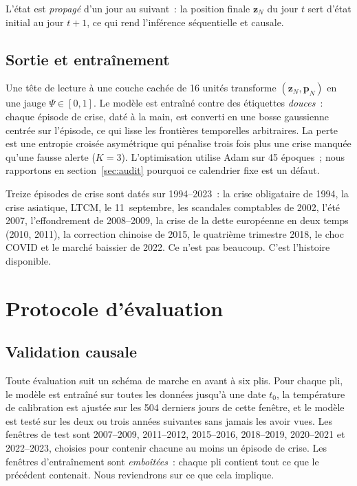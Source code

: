 \documentclass[11pt,a4paper]{article}
\newcommand{\Psiv}{\Psi}
\begin{document}
L'état est \emph{propagé} d'un jour au suivant~: la position finale $\mathbf z_N$ du jour $t$ sert d'état initial au jour $t+1$, ce qui rend l'inférence séquentielle et causale.

\subsection{Sortie et entraînement}

Une tête de lecture à une couche cachée de 16 unités transforme $(\mathbf z_N,\mathbf p_N)$ en une jauge $\Psiv\in[0,1]$. Le modèle est entraîné contre des étiquettes \emph{douces}~: chaque épisode de crise, daté à la main, est converti en une bosse gaussienne centrée sur l'épisode, ce qui lisse les frontières temporelles arbitraires. La perte est une entropie croisée asymétrique qui pénalise trois fois plus une crise manquée qu'une fausse alerte ($K=3$). L'optimisation utilise Adam sur 45 époques~; nous rapportons en section~\ref{sec:audit} pourquoi ce calendrier fixe est un défaut.

Treize épisodes de crise sont datés sur 1994--2023~: la crise obligataire de 1994, la crise asiatique, LTCM, le 11~septembre, les scandales comptables de 2002, l'été 2007, l'effondrement de 2008--2009, la crise de la dette européenne en deux temps (2010, 2011), la correction chinoise de 2015, le quatrième trimestre 2018, le choc COVID et le marché baissier de 2022. Ce n'est pas beaucoup. C'est l'histoire disponible.

\section{Protocole d'évaluation}
\label{sec:protocol}

\subsection{Validation causale}

Toute évaluation suit un schéma de marche en avant à six plis. Pour chaque pli, le modèle est entraîné sur toutes les données jusqu'à une date $t_0$, la température de calibration est ajustée sur les 504 derniers jours de cette fenêtre, et le modèle est testé sur les deux ou trois années suivantes sans jamais les avoir vues. Les fenêtres de test sont 2007--2009, 2011--2012, 2015--2016, 2018--2019, 2020--2021 et 2022--2023, choisies pour contenir chacune au moins un épisode de crise. Les fenêtres d'entraînement sont \emph{emboîtées}~: chaque pli contient tout ce que le précédent contenait. Nous reviendrons sur ce que cela implique.
\end{document}
